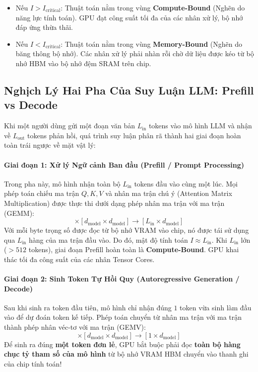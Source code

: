 \begin{itemize}
  \item Nếu $I > I_{\text{critical}}$: Thuật toán nằm trong vùng \textbf{Compute-Bound} (Nghẽn do năng lực tính toán). GPU đạt công suất tối đa của các nhân xử lý, bộ nhớ đáp ứng thừa thãi.
  \item Nếu $I < I_{\text{critical}}$: Thuật toán nằm trong vùng \textbf{Memory-Bound} (Nghẽn do băng thông bộ nhớ). Các nhân xử lý phải nhàn rỗi chờ dữ liệu được kéo từ bộ nhớ HBM vào bộ nhớ đệm SRAM trên chip.
\end{itemize}

\subsection{Nghịch Lý Hai Pha Của Suy Luận LLM: Prefill vs Decode}

Khi một người dùng gửi một đoạn văn bản $L_{\text{in}}$ tokens vào mô hình LLM và nhận về $L_{\text{out}}$ tokens phản hồi, quá trình suy luận phân rã thành hai giai đoạn hoàn toàn trái ngược về mặt vật lý:

\paragraph{Giai đoạn 1: Xử lý Ngữ cảnh Ban đầu (Prefill / Prompt Processing)}
Trong pha này, mô hình nhận toàn bộ $L_{\text{in}}$ tokens đầu vào cùng một lúc. Mọi phép toán chiếu ma trận $Q, K, V$ và nhân ma trận chú ý (Attention Matrix Multiplication) được thực thi dưới dạng phép nhân ma trận với ma trận (GEMM):
\begin{equation}
[L_{\text{in}} \times d_{\text{model}}] \times [d_{\text{model}} \times d_{\text{model}}] \longrightarrow [L_{\text{in}} \times d_{\text{model}}]
\end{equation}
Với mỗi byte trọng số được đọc từ bộ nhớ VRAM vào chip, nó được tái sử dụng qua $L_{\text{in}}$ hàng của ma trận đầu vào. Do đó, mật độ tính toán $I \approx L_{\text{in}}$. Khi $L_{\text{in}}$ lớn ($> 512$ tokens), giai đoạn Prefill hoàn toàn là \textbf{Compute-Bound}. GPU khai thác tối đa công suất của các nhân Tensor Cores.

\paragraph{Giai đoạn 2: Sinh Token Tự Hồi Quy (Autoregressive Generation / Decode)}
Sau khi sinh ra token đầu tiên, mô hình chỉ nhận đúng $1$ token vừa sinh làm đầu vào để dự đoán token kế tiếp. Phép toán chuyển từ nhân ma trận với ma trận thành phép nhân véc-tơ với ma trận (GEMV):
\begin{equation}
[1 \times d_{\text{model}}] \times [d_{\text{model}} \times d_{\text{model}}] \longrightarrow [1 \times d_{\text{model}}]
\end{equation}
Để sinh ra đúng \textbf{một token đơn lẻ}, GPU bắt buộc phải đọc \textbf{toàn bộ hàng chục tỷ tham số của mô hình} từ bộ nhớ VRAM HBM chuyển vào thanh ghi của chip tính toán! 

